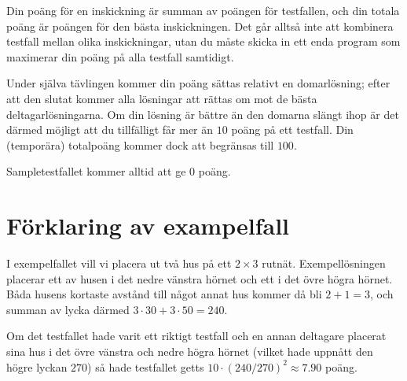 Din poäng för en inskickning är summan av poängen för testfallen, och din totala poäng är poängen för den bästa inskickningen.
Det går alltså inte att kombinera testfall mellan olika inskickningar, utan du måste skicka in ett enda program som
maximerar din poäng på alla testfall samtidigt.

Under själva tävlingen kommer din poäng sättas relativt en domarlösning;
efter att den slutat kommer alla lösningar att rättas om mot de bästa deltagarlösningarna.
Om din lösning är bättre än den domarna slängt ihop är det därmed möjligt att du tillfälligt får mer än $10$ poäng på ett testfall.
Din (temporära) totalpoäng kommer dock att begränsas till $100$.

Sampletestfallet kommer alltid att ge $0$ poäng.


\section*{Förklaring av exampelfall}
I exempelfallet vill vi placera ut två hus på ett $2 \times 3$ rutnät.
Exempellösningen placerar ett av husen i det nedre vänstra hörnet och ett i det övre högra hörnet.
Båda husens kortaste avstånd till något annat hus kommer då bli $2 + 1 = 3$,
och summan av lycka därmed $3 \cdot 30 + 3 \cdot 50 = 240$.

Om det testfallet hade varit ett riktigt testfall och en annan deltagare placerat sina hus
i det övre vänstra och nedre högra hörnet (vilket hade uppnått den högre lyckan $270$) så hade
testfallet getts $10 \cdot (240 / 270)^2 \approx 7.90$ poäng.

